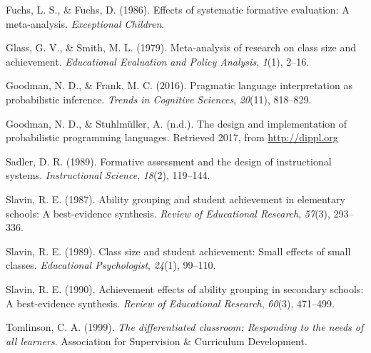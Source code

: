 \documentclass[10pt, letterpaper]{article}
\begin{document}
\hypertarget{ref-fuchs1986}{}
Fuchs, L. S., \& Fuchs, D. (1986). Effects of systematic formative
evaluation: A meta-analysis. \emph{Exceptional Children}.

\hypertarget{ref-glass1979}{}
Glass, G. V., \& Smith, M. L. (1979). Meta-analysis of research on class
size and achievement. \emph{Educational Evaluation and Policy Analysis},
\emph{1}(1), 2--16.

\hypertarget{ref-goodman2016}{}
Goodman, N. D., \& Frank, M. C. (2016). Pragmatic language
interpretation as probabilistic inference. \emph{Trends in Cognitive
Sciences}, \emph{20}(11), 818--829.

\hypertarget{ref-goodman2017}{}
Goodman, N. D., \& Stuhlmüller, A. (n.d.). The design and implementation
of probabilistic programming languages. Retrieved 2017, from
\url{http://dippl.org}

\hypertarget{ref-sadler1989}{}
Sadler, D. R. (1989). Formative assessment and the design of
instructional systems. \emph{Instructional Science}, \emph{18}(2),
119--144.

\hypertarget{ref-slavin1987}{}
Slavin, R. E. (1987). Ability grouping and student achievement in
elementary schools: A best-evidence synthesis. \emph{Review of
Educational Research}, \emph{57}(3), 293--336.

\hypertarget{ref-slavin1989}{}
Slavin, R. E. (1989). Class size and student achievement: Small effects
of small classes. \emph{Educational Psychologist}, \emph{24}(1),
99--110.

\hypertarget{ref-slavin1990}{}
Slavin, R. E. (1990). Achievement effects of ability grouping in
secondary schools: A best-evidence synthesis. \emph{Review of
Educational Research}, \emph{60}(3), 471--499.

\hypertarget{ref-tomlinson1999}{}
Tomlinson, C. A. (1999). \emph{The differentiated classroom: Responding
to the needs of all learners}. Association for Supervision \& Curriculum
Development.
\end{document}
